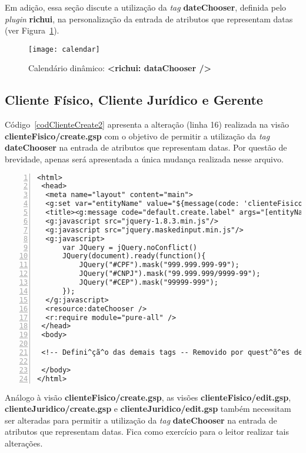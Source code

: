 Em  adição, essa  seção discute  a utilização  da {\it  tag}  {\bf dateChooser},
definida  pelo  {\it plugin}  {\bf  richui},  na  personalização da  entrada  de
atributos que representam datas (ver Figura~\ref{calendarFig}).

\begin{figure}[htbp]
\centering
\texttt{[image: calendar]}
\caption{Calendário dinâmico: {\bf <richui: dataChooser />}}
\label{calendarFig}
\end{figure}

\subsection{Cliente Físico, Cliente Jurídico e Gerente}

\vspace{0.3cm}

Código~\ref{codClienteCreate2}  apresenta a  alteração (linha  16)  realizada na
visão {\bf clienteFisico/create.gsp} com o  objetivo de permitir a utilização da
{\it tag} {\bf  dateChooser} na entrada de atributos  que representam datas. Por
questão de  brevidade, apenas será  apresentada a única mudança  realizada nesse
arquivo.  

 \begin{lstlisting}[numbers=left,  caption=Visão {\bf clienteFisico/create.gsp},
     frame=trBL, float=htbp, label=codClienteCreate2] 
<html>
 <head>
  <meta name="layout" content="main">
  <g:set var="entityName" value="${message(code: 'clienteFisico.label', default: 'ClienteFisico')}" />
  <title><g:message code="default.create.label" args="[entityName]" /></title>
  <g:javascript src="jquery-1.8.3.min.js"/>
  <g:javascript src="jquery.maskedinput.min.js"/> 
  <g:javascript>
      var JQuery = jQuery.noConflict()
      JQuery(document).ready(function(){
          JQuery("#CPF").mask("999.999.999-99");
          JQuery("#CNPJ").mask("99.999.999/9999-99");
          JQuery("#CEP").mask("99999-999");
      });
  </g:javascript>
  <resource:dateChooser />
  <r:require module="pure-all" />
 </head>
 <body>

 <!-- Defini^çã^o das demais tags -- Removido por quest^õ^es de brevidade --> 

 </body>
</html>
\end{lstlisting}

\vspace{0.3cm}

\begin{remark}
Análogo    à   visão    {\bf   clienteFisico/create.gsp},    as    visões   {\bf
  clienteFisico/edit.gsp},     {\bf    clienteJuridico/create.gsp}     e    {\bf
  clienteJuridico/edit.gsp}  também  necessitam ser  alteradas  para permitir  a
utilização  da  {\it  tag}  {\bf   dateChooser}  na  entrada  de  atributos  que
representam datas.  Fica como exercício para o leitor realizar tais alterações.  
\end{remark}

